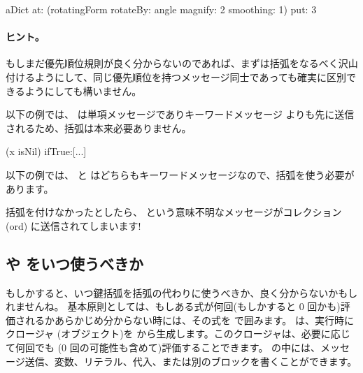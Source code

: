 \documentclass[a4paper,10pt,twoside]{book}
\begin{document}
\begin{code}{}
aDict
   at: (rotatingForm 
          rotateBy: angle	
          magnify: 2 
          smoothing: 1)
   put: 3
\end{code}



\paragraph{ヒント。} もしまだ優先順位規則が良く分からないのであれば、まずは括弧をなるべく沢山付けるようにして、同じ優先順位を持つメッセージ同士であっても確実に区別できるようにしても構いません。

以下の例では、 は単項メッセージでありキーワードメッセージ  よりも先に送信されるため、括弧は本来必要ありません。
\begin{code}{}
(x isNil)
   ifTrue:[...]
\end{code}

以下の例では、 と  はどちらもキーワードメッセージなので、括弧を使う必要があります。
\noindent
括弧を付けなかったとしたら、 という意味不明なメッセージがコレクション (ord) に送信されてしまいます!

\subsection{\lct{[ ]} や \lct{( )} をいつ使うべきか}
もしかすると、いつ鍵括弧を括弧の代わりに使うべきか、良く分からないかもしれませんね。
基本原則としては、もしある式が何回(もしかすると 0 回かも)評価されるかあらかじめ分からない時には、その式を \ct{[ ]} で囲みます。
 は、実行時に  クロージャ (\ie オブジェクト)を  から生成します。このクロージャは、必要に応じて何回でも (0 回の可能性も含めて)評価することできます。\ct{[ ]} の中には、メッセージ送信、変数、リテラル、代入、または別のブロックを書くことができます。
\end{document}
